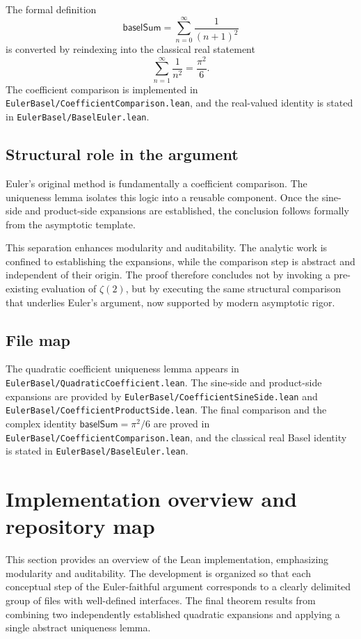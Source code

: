 \documentclass[11pt,a4paper]{article}
\theoremstyle{plain}
\theoremstyle{definition}
\DeclareRobustCommand{\codepath}[1]{\nolinkurl{#1}}
\DeclareRobustCommand{\codepath}[1]{\nolinkurl{#1}}
\newcommand{\baselSum}{\ensuremath{\mathsf{baselSum}}}
\begin{document}
The formal definition
\[
\baselSum
=
\sum_{n=0}^{\infty} \frac{1}{(n+1)^{2}}
\]
is converted by reindexing into the classical real statement
\[
\sum_{n=1}^{\infty} \frac{1}{n^{2}}
=
\frac{\pi^{2}}{6}.
\]
The coefficient comparison is implemented in \codepath{EulerBasel/CoefficientComparison.lean}, and the real-valued identity is stated in \codepath{EulerBasel/BaselEuler.lean}.

\subsection{Structural role in the argument}

Euler’s original method is fundamentally a coefficient comparison. The uniqueness lemma isolates this logic into a reusable component. Once the sine-side and product-side expansions are established, the conclusion follows formally from the asymptotic template.

This separation enhances modularity and auditability. The analytic work is confined to establishing the expansions, while the comparison step is abstract and independent of their origin. The proof therefore concludes not by invoking a pre-existing evaluation of \(\zeta(2)\), but by executing the same structural comparison that underlies Euler’s argument, now supported by modern asymptotic rigor.

\subsection{File map}

The quadratic coefficient uniqueness lemma appears in
\codepath{EulerBasel/QuadraticCoefficient.lean}.  
The sine-side and product-side expansions are provided by
\codepath{EulerBasel/CoefficientSineSide.lean} and
\codepath{EulerBasel/CoefficientProductSide.lean}.  
The final comparison and the complex identity
\(\baselSum = \pi^{2}/6\) are proved in
\codepath{EulerBasel/CoefficientComparison.lean}, and the classical real Basel identity is stated in
\codepath{EulerBasel/BaselEuler.lean}.

\section{Implementation overview and repository map}

This section provides an overview of the Lean implementation, emphasizing modularity and auditability. The development is organized so that each conceptual step of the Euler-faithful argument corresponds to a clearly delimited group of files with well-defined interfaces. The final theorem results from combining two independently established quadratic expansions and applying a single abstract uniqueness lemma.
\end{document}
